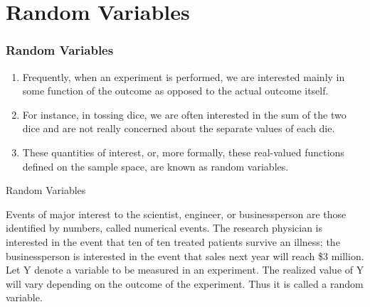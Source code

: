 \documentclass[compress]{beamer}
\begin{document}
\section{Random Variables   }

\begin{frame}\frametitle{Random Variables}
\begin{enumerate}
\item Frequently, when an experiment is performed, we are interested
mainly in some function of the outcome as opposed to the actual
outcome itself.\\
\vspace{.4in}
\item For instance, in tossing dice, we are often interested in the sum of the two dice and are not really concerned about the separate values of each die.\\
\vspace{.4in}

\item These quantities of interest, or, more formally, these real-valued
functions defined on the sample space, are known as random
variables.
\end{enumerate}


\end{frame}

\begin{frame}{Random Variables}

Events of major interest to the scientist, engineer, or businessperson are those identified by numbers, called numerical events. The research physician is interested in the event that ten of ten treated patients survive an illness; the businessperson is interested in the event that sales next year will reach  \$3 million.  Let Y denote a variable to be measured in an experiment.  The realized value of Y will vary depending on the outcome of the experiment. Thus  it is called a random variable. \\

\end{frame}
\end{document}
